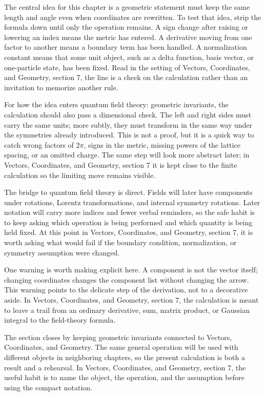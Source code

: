 The central idea for this chapter is a geometric statement must keep the same length and angle even when coordinates are rewritten.  To test that idea, strip the formula down until only the operation remains.  A sign change after raising or lowering an index means the metric has entered.  A derivative moving from one factor to another means a boundary term has been handled.  A normalization constant means that some unit object, such as a delta function, basis vector, or one-particle state, has been fixed.  Read in the setting of Vectors, Coordinates, and Geometry, section 7, the line is a check on the calculation rather than an invitation to memorize another rule.

For how the idea enters quantum field theory: geometric invariants, the calculation should also pass a dimensional check.  The left and right sides must carry the same units; more subtly, they must transform in the same way under the symmetries already introduced.  This is not a proof, but it is a quick way to catch wrong factors of \(2\pi\), signs in the metric, missing powers of the lattice spacing, or an omitted charge.  The same step will look more abstract later; in Vectors, Coordinates, and Geometry, section 7 it is kept close to the finite calculation so the limiting move remains visible.

The bridge to quantum field theory is direct.  Fields will later have components under rotations, Lorentz transformations, and internal symmetry rotations.  Later notation will carry more indices and fewer verbal reminders, so the safe habit is to keep asking which operation is being performed and which quantity is being held fixed.  At this point in Vectors, Coordinates, and Geometry, section 7, it is worth asking what would fail if the boundary condition, normalization, or symmetry assumption were changed.

One warning is worth making explicit here.  A component is not the vector itself; changing coordinates changes the component list without changing the arrow.  This warning points to the delicate step of the derivation, not to a decorative aside.  In Vectors, Coordinates, and Geometry, section 7, the calculation is meant to leave a trail from an ordinary derivative, sum, matrix product, or Gaussian integral to the field-theory formula.

The section closes by keeping geometric invariants connected to Vectors, Coordinates, and Geometry.  The same general operation will be used with different objects in neighboring chapters, so the present calculation is both a result and a rehearsal.  In Vectors, Coordinates, and Geometry, section 7, the useful habit is to name the object, the operation, and the assumption before using the compact notation.



